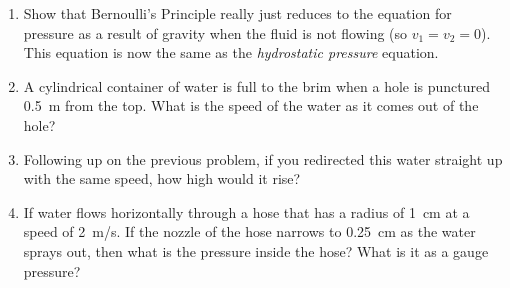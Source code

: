 \begin{enumerate}
	\item
	Show that Bernoulli's Principle really just reduces to the equation for pressure as a result of gravity when the fluid is not flowing (so $v_1=v_2=0$). This equation is now the same as the \emph{hydrostatic pressure} equation. 
	
	\item
	A cylindrical container of water is full to the brim when a hole is punctured \SI{0.5}{\meter} from the top. What is the speed of the water as it comes out of the hole?
	
	\item 
	Following up on the previous problem, if you redirected this water straight up with the same speed, how high would it rise?
	
	\item
	If water flows horizontally through a hose that has a radius of \SI{1}{cm} at a speed of \SI{2}{m/s}. If the nozzle of the hose narrows to \SI{0.25}{cm} as the water sprays out, then what is the pressure inside the hose? What is it as a gauge pressure?
	
	
\end{enumerate}